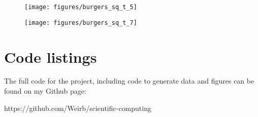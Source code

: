 \begin{figure}[ht!]
	\centering
    \texttt{[image: figures/burgers\_sq\_t\_5]}
    \caption{}
    \label{fig:burgers_sq_t_2}
\end{figure}

\begin{figure}[ht!]
	\centering
    \texttt{[image: figures/burgers\_sq\_t\_7]}
    \caption{}
    \label{fig:burgers_sq_t_3}
\end{figure}



\iffalse
\clearpage
\section{Tables}

\bgroup
\def\arraystretch{1.3}
\begin{table}[ht!]
  \sisetup{round-mode=places, round-precision=5}
  \csvstyle{myTableStyle}{longtable=R{1cm} R{2.4cm} R{2.8cm},
  table head={\caption{Iteration counts and execution times for the matrix defined in \ref{sec:mat2}, $m=5$.}\label{tab:matrix2-compare-5}\\ $n$ & Iteration count & Execution time \\ \hline},
  late after line=\\, no head, separator=tab,
  filter equal={\cii}{5}}
  \csvreader[myTableStyle]{DATAFILE}{1=\ci, 2=\cii, 3=\ciii, 4=\civ}
  {\ci & \ciii & \num{\civ}}
\end{table}
\egroup

\fi

\clearpage
\section{Code listings}
\label{sec:code}

The full code for the project, including code to generate data and figures can be found on my Github page: 

https://github.com/Weirb/scientific-computing



\par\bigskip


\par\bigskip

